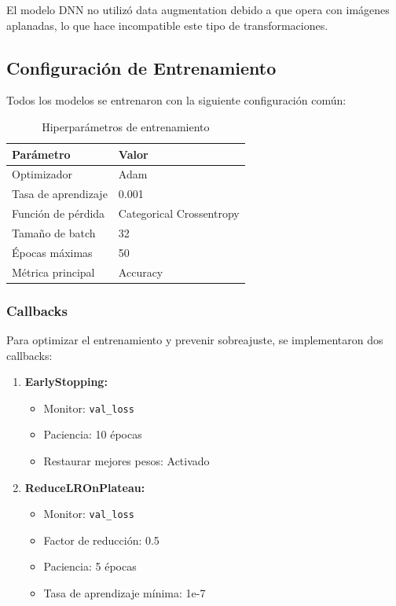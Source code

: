 \documentclass[11pt, a4paper]{article}
\begin{document}
El modelo DNN no utilizó data augmentation debido a que opera con imágenes aplanadas, lo que hace incompatible este tipo de transformaciones.

\subsection{Configuración de Entrenamiento}

Todos los modelos se entrenaron con la siguiente configuración común:

\begin{table}[H]
\centering
\caption{Hiperparámetros de entrenamiento}
\label{tab:hiperparametros}
\begin{tabular}{@{}ll@{}}
\toprule
\textbf{Parámetro} & \textbf{Valor} \\
\midrule
Optimizador          & Adam \\
Tasa de aprendizaje  & 0.001 \\
Función de pérdida   & Categorical Crossentropy \\
Tamaño de batch      & 32 \\
Épocas máximas       & 50 \\
Métrica principal    & Accuracy \\
\bottomrule
\end{tabular}
\end{table}

\subsubsection{Callbacks}

Para optimizar el entrenamiento y prevenir sobreajuste, se implementaron dos callbacks:

\begin{enumerate}
    \item \textbf{EarlyStopping:}
    \begin{itemize}
        \item Monitor: \texttt{val\_loss}
        \item Paciencia: 10 épocas
        \item Restaurar mejores pesos: Activado
    \end{itemize}
    
    \item \textbf{ReduceLROnPlateau:}
    \begin{itemize}
        \item Monitor: \texttt{val\_loss}
        \item Factor de reducción: 0.5
        \item Paciencia: 5 épocas
        \item Tasa de aprendizaje mínima: 1e-7
    \end{itemize}
\end{enumerate}
\end{document}

